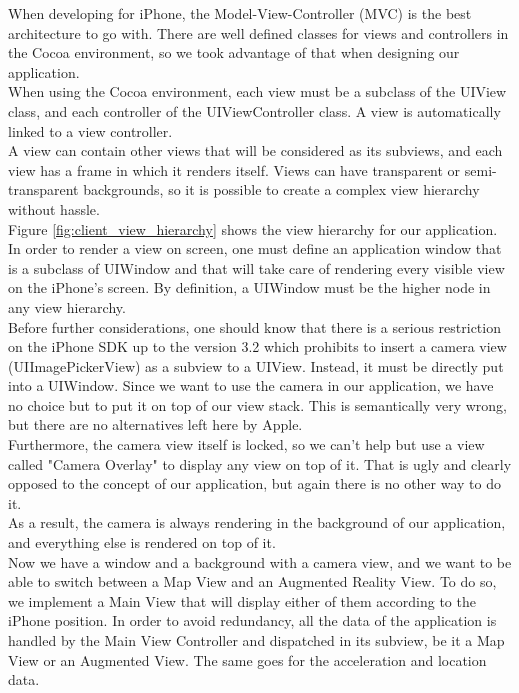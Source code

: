 When developing for iPhone, the Model-View-Controller (MVC) is the best architecture to go with. There are well defined classes for views and controllers in the Cocoa environment, so we took advantage of that when designing our application.\\

When using the Cocoa environment, each view must be a subclass of the UIView class, and each controller of the UIViewController class. A view is automatically linked to a view controller.\\

A view can contain other views that will be considered as its subviews, and each view has a frame in which it renders itself. Views can have transparent or semi-transparent backgrounds, so it is possible to create a complex view hierarchy without hassle.\\

Figure \ref{fig:client_view_hierarchy} shows the view hierarchy for our application.\\

In order to render a view on screen, one must define an application window that is a subclass of UIWindow and that will take care of rendering every visible view on the iPhone's screen. By definition, a UIWindow must be the higher node in any view hierarchy.\\

Before further considerations, one should know that there is a serious restriction on the iPhone SDK up to the version 3.2 which prohibits to insert a camera view (UIImagePickerView) as a subview to a UIView. Instead, it must be directly put into a UIWindow. Since we want to use the camera in our application, we have no choice but to put it on top of our view stack. This is semantically very wrong, but there are no alternatives left here by Apple.\\

Furthermore, the camera view itself is locked, so we can't help but use a view called "Camera Overlay" to display any view on top of it. That is ugly and clearly opposed to the concept of our application, but again there is no other way to do it.\\

As a result, the camera is always rendering in the background of our application, and everything else is rendered on top of it.\\

Now we have a window and a background with a camera view, and we want to be able to switch between a Map View and an Augmented Reality View. To do so, we implement a Main View that will display either of them according to the iPhone position. In order to avoid redundancy, all the data of the application is handled by the Main View Controller and dispatched in its subview, be it a Map View or an Augmented View. The same goes for the acceleration and location data.\\

